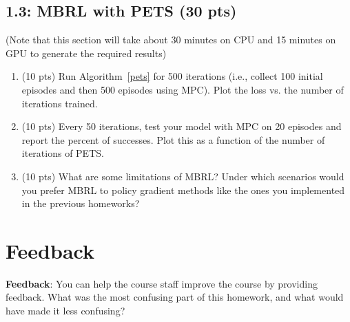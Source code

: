 \documentclass[12pt]{article}
\begin{document}
\subsection*{1.3: MBRL with PETS (30 pts)}
(Note that this section will take about 30 minutes on CPU and 15 minutes on GPU to generate the required results)
\begin{enumerate}
    \item (10 pts) Run Algorithm~\ref{pets} for 500 iterations (i.e., collect 100 initial episodes and then 500 episodes using MPC).  Plot the loss vs. the number of iterations trained.
    
    \item (10 pts) Every 50 iterations, test your model with MPC on 20 episodes and report the percent of successes.  Plot this as a function of the number of iterations of PETS.
    
    \item (10 pts) What are some limitations of MBRL?  Under which scenarios would you prefer MBRL to policy gradient methods like the ones you implemented in the previous homeworks?
\end{enumerate}




\newpage
\section*{Feedback}

\textbf{Feedback}: You can help the course staff improve the course by providing feedback. What was the most confusing part of this homework, and what would have made it less confusing?
\end{document}

